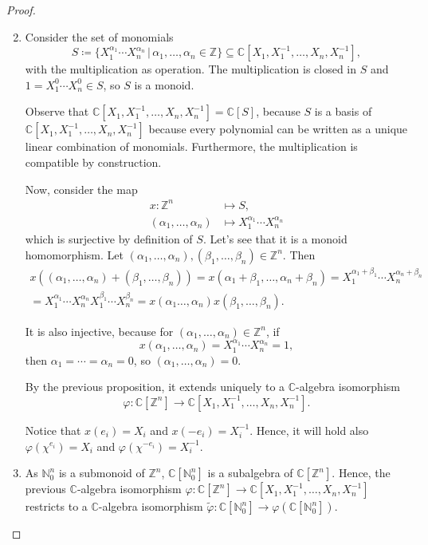\documentclass[12pt]{article}
\theoremstyle{definition}
\begin{document}
\begin{proof}
\begin{enumerate}[label=\arabic*)]
\setcounter{enumi}{1}
\item Consider the set of monomials
\[S\coloneqq\{X_1^{\alpha_1}\cdots X_n^{\alpha_n}\,|\,\alpha_1,\ldots,\alpha_n\in\mathbb{Z}\}\subseteq\mathbb{C}[X_1,X_1^{-1},\ldots,X_n,X_n^{-1}],\]
with the multiplication as operation. The multiplication is closed in $S$ and $1=X_1^0\cdots X_n^0\in S$, so $S$ is a monoid.

Observe that $\mathbb{C}[X_1,X_1^{-1},\ldots,X_n,X_n^{-1}]=\mathbb{C}[S]$, because $S$ is a basis of $\mathbb{C}[X_1,X_1^{-1},\ldots,X_n,X_n^{-1}]$ because every polynomial can be written as a unique linear combination of monomials. Furthermore, the multiplication is compatible by construction.

Now, consider the map
\begin{align*}
x:\mathbb{Z}^n&\longmapsto S,\\
(\alpha_1,\ldots,\alpha_n)&\longmapsto X_1^{\alpha_1}\cdots X_n^{\alpha_n}
\end{align*}
which is surjective by definition of $S$. Let's see that it is a monoid homomorphism. Let $(\alpha_1,\ldots,\alpha_n),(\beta_1,\ldots,\beta_n)\in\mathbb{Z}^n$. Then
\begin{multline*}
x((\alpha_1,\ldots,\alpha_n)+(\beta_1,\ldots,\beta_n))=x(\alpha_1+\beta_1,\ldots,\alpha_n+\beta_n)=X_1^{\alpha_1+\beta_1}\cdots X_n^{\alpha_n+\beta_n}\\
=X_1^{\alpha_1}\cdots X_n^{\alpha_n}X_1^{\beta_1}\cdots X_n^{\beta_n}=x(\alpha_1\ldots,\alpha_n)x(\beta_1,\ldots,\beta_n).
\end{multline*}

It is also injective, because for $(\alpha_1,\ldots,\alpha_n)\in\mathbb{Z}^n$, if
\[x(\alpha_1,\ldots,\alpha_n)=X_1^{\alpha_1}\cdots X_n^{\alpha_n}=1,\]
then $\alpha_1=\cdots=\alpha_n=0$, so $(\alpha_1,\ldots,\alpha_n)=0$.

By the previous proposition, it extends uniquely to a $\mathbb{C}$-algebra isomorphism
\[\varphi:\mathbb{C}[\mathbb{Z}^n]\longrightarrow\mathbb{C}[X_1,X_1^{-1},\ldots,X_n,X_n^{-1}].\]

Notice that $x(e_i)=X_i$ and $x(-e_i)=X_i^{-1}$. Hence, it will hold also $\varphi(\chi^{e_i})=X_i$ and $\varphi(\chi^{-e_i})=X_i^{-1}$.

\setcounter{enumi}{0}
\item As $\mathbb{N}_0^n$ is a submonoid of $\mathbb{Z}^n$, $\mathbb{C}[\mathbb{N}_0^n]$ is a subalgebra of $\mathbb{C}[\mathbb{Z}^n]$. Hence, the previous $\mathbb{C}$-algebra isomorphism $\varphi:\mathbb{C}[\mathbb{Z}^n]\rightarrow\mathbb{C}[X_1,X_1^{-1},\ldots,X_n,X_n^{-1}]$ restricts to a $\mathbb{C}$-algebra isomorphism $\tilde{\varphi}:\mathbb{C}[\mathbb{N}_0^n]\rightarrow\varphi(\mathbb{C}[\mathbb{N}_0^n])$.


\end{enumerate}
\end{proof}
\end{document}
